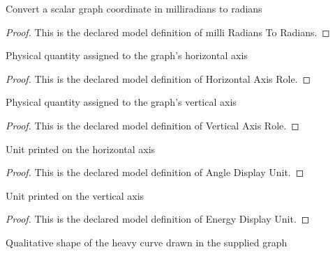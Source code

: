 \begin{definition}
  \label{def:physics:phyx-mini-0274:phyxminiproblems-problemphyxmini0274-milliradianstoradians}
  Convert a scalar graph coordinate in milliradians to radians
\end{definition}
\begin{proof}
  This is the declared model definition of milli Radians To Radians.
\end{proof}
\begin{definition}
  \label{def:physics:phyx-mini-0274:phyxminiproblems-problemphyxmini0274-horizontalaxisrole}
  Physical quantity assigned to the graph's horizontal axis
\end{definition}
\begin{proof}
  This is the declared model definition of Horizontal Axis Role.
\end{proof}
\begin{definition}
  \label{def:physics:phyx-mini-0274:phyxminiproblems-problemphyxmini0274-verticalaxisrole}
  Physical quantity assigned to the graph's vertical axis
\end{definition}
\begin{proof}
  This is the declared model definition of Vertical Axis Role.
\end{proof}
\begin{definition}
  \label{def:physics:phyx-mini-0274:phyxminiproblems-problemphyxmini0274-angledisplayunit}
  Unit printed on the horizontal axis
\end{definition}
\begin{proof}
  This is the declared model definition of Angle Display Unit.
\end{proof}
\begin{definition}
  \label{def:physics:phyx-mini-0274:phyxminiproblems-problemphyxmini0274-energydisplayunit}
  Unit printed on the vertical axis
\end{definition}
\begin{proof}
  This is the declared model definition of Energy Display Unit.
\end{proof}
\begin{definition}
  \label{def:physics:phyx-mini-0274:phyxminiproblems-problemphyxmini0274-graphcurveshape}
  Qualitative shape of the heavy curve drawn in the supplied graph
\end{definition}
